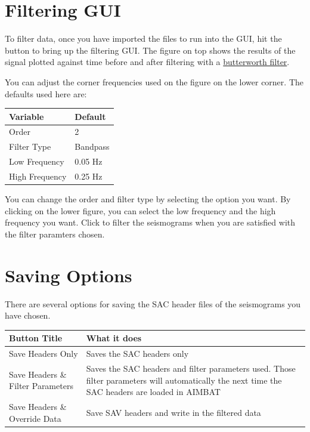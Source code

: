 \documentclass[letterpaper,10pt,english]{sphinxmanual}
\begin{document}
\section{Filtering GUI}
\label{docfiles/filteringData:filtering-gui}
To filter data, once you have imported the files to run into the GUI, hit the  button to bring up the filtering GUI. The figure on top shows the results of the signal plotted against time before and after filtering with a \href{http://en.wikipedia.org/wiki/Butterworth\_filter}{butterworth filter}.

You can adjust the corner frequencies used on the figure on the lower corner. The defaults used here are:

\begin{tabulary}{\linewidth}{|L|L|}
\hline
\textsf{\relax 
Variable
} & \textsf{\relax 
Default
}\\
\hline
Order
 & 
2
\\

Filter Type
 & 
Bandpass
\\

Low Frequency
 & 
0.05 Hz
\\

High Frequency
 & 
0.25 Hz
\\
\hline\end{tabulary}


You can change the order and filter type by selecting the option you want. By clicking on the lower figure, you can select the low frequency and the high frequency you want. Click  to filter the seismograms when you are satisfied with the filter paramters chosen.


\section{Saving Options}
\label{docfiles/filteringData:saving-options}
There are several options for saving the SAC header files of the seismograms you have chosen.

\begin{tabulary}{\linewidth}{|L|L|}
\hline
\textsf{\relax 
Button Title
} & \textsf{\relax 
What it does
}\\
\hline
Save Headers Only
 & 
Saves the SAC headers only
\\

Save Headers \& Filter Parameters
 & 
Saves the SAC headers and filter parameters used.
Those filter parameters will automatically the
next time the SAC headers are loaded in AIMBAT
\\

Save Headers \& Override Data
 & 
Save SAV headers and write in the filtered data
\\
\hline\end{tabulary}
\end{document}
